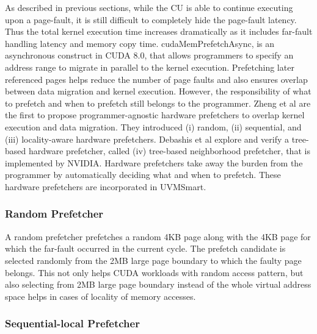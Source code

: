 As described in previous sections, while the CU is able to continue executing upon a page-fault, it is still difficult to completely hide the page-fault latency. Thus the total kernel execution time increases dramatically as it includes far-fault handling latency and memory copy time. cudaMemPrefetchAsync, is an asynchronous construct in CUDA 8.0, that allows programmers to specify an address range to migrate in parallel to the kernel execution. Prefetching later referenced pages helps reduce the number of page faults and also ensures overlap between data migration and kernel execution. However, the responsibility of what to prefetch and when to prefetch still belongs to the programmer. Zheng et al are the first to propose programmer-agnostic hardware prefetchers to overlap kernel execution and data migration. They introduced (i) random, (ii) sequential, and (iii) locality-aware hardware prefetchers. Debashis et al explore and verify a tree-based hardware prefetcher, called (iv) tree-based neighborhood prefetcher, that is implemented by NVIDIA. Hardware prefetchers take away the burden from the programmer by automatically deciding what and when to prefetch. These hardware prefetchers are incorporated in UVMSmart.


\subsubsection{Random Prefetcher}

A random prefetcher prefetches a random 4KB page along with the 4KB page for which the far-fault occurred in the current cycle. The prefetch candidate is selected randomly from the 2MB large page boundary to which the faulty page belongs. This not only helps CUDA workloads with random access pattern, but also selecting from 2MB large page boundary instead of the whole virtual address space helps in cases of locality of memory accesses.

\subsubsection{Sequential-local Prefetcher}

